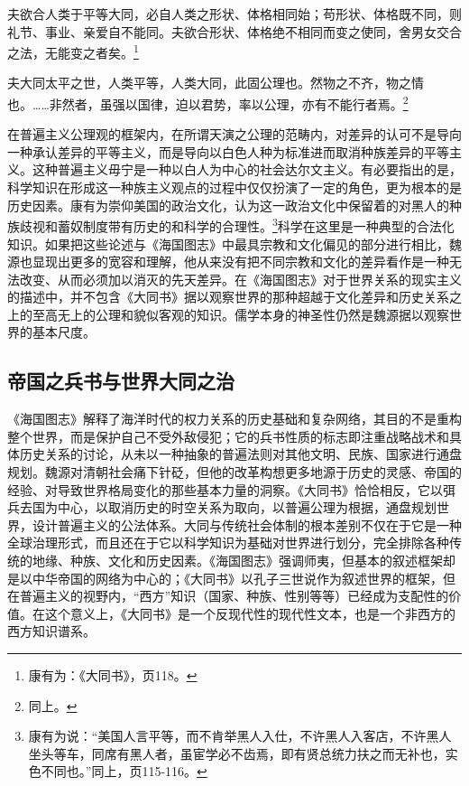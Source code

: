 \documentclass[a4paper, 12pt, openright]{ctexbook}
\renewenvironment{quote}
  {\list{}{\rightmargin2\ccwd \leftmargin2\ccwd \itemindent=2\ccwd \listparindent=2\ccwd}%
   \item\relax\small\kaishu\color{black}}
  {\endlist}
\begin{document}
\begin{quote}
夫欲合人类于平等大同，必自人类之形状、体格相同始；苟形状、体格既不同，则礼节、事业、亲爱自不能同。夫欲合形状、体格绝不相同而变之使同，舍男女交合之法，无能变之者矣。\footnote{康有为：《大同书》，页118。}

夫大同太平之世，人类平等，人类大同，此固公理也。然物之不齐，物之情也。……非然者，虽强以国律，迫以君势，率以公理，亦有不能行者焉。\footnote{同上。}
\end{quote}

在普遍主义公理观的框架内，在所谓天演之公理的范畴内，对差异的认可不是导向一种承认差异的平等主义，而是导向以白色人种为标准进而取消种族差异的平等主义。这种普遍主义毋宁是一种以白人为中心的社会达尔文主义。有必要指出的是，科学知识在形成这一种族主义观点的过程中仅仅扮演了一定的角色，更为根本的是历史因素。康有为崇仰美国的政治文化，认为这一政治文化中保留着的对黑人的种族歧视和蓄奴制度带有历史的和科学的合理性。\footnote{康有为说：“美国人言平等，而不肯举黑人入仕，不许黑人入客店，不许黑人坐头等车，同席有黑人者，虽宦学必不齿焉，即有贤总统力扶之而无补也，实色不同也。”同上，页115-116。}科学在这里是一种典型的合法化知识。如果把这些论述与《海国图志》中最具宗教和文化偏见的部分进行相比，魏源也显现出更多的宽容和理解，他从来没有把不同宗教和文化的差异看作是一种无法改变、从而必须加以消灭的先天差异。在《海国图志》对于世界关系的现实主义的描述中，并不包含《大同书》据以观察世界的那种超越于文化差异和历史关系之上的至高无上的公理和貌似客观的知识。儒学本身的神圣性仍然是魏源据以观察世界的基本尺度。

\subsection{帝国之兵书与世界大同之治}

《海国图志》解释了海洋时代的权力关系的历史基础和复杂网络，其目的不是重构整个世界，而是保护自己不受外敌侵犯；它的兵书性质的标志即注重战略战术和具体历史关系的讨论，从未以一种抽象的普遍法则对其他文明、民族、国家进行通盘规划。魏源对清朝社会痛下针砭，但他的改革构想更多地源于历史的灵感、帝国的经验、对导致世界格局变化的那些基本力量的洞察。《大同书》恰恰相反，它以弭兵去国为中心，以取消历史的时空关系为取向，以普遍公理为根据，通盘规划世界，设计普遍主义的公法体系。大同与传统社会体制的根本差别不仅在于它是一种全球治理形式，而且还在于它以科学知识为基础对世界进行划分，完全排除各种传统的地缘、种族、文化和历史因素。《海国图志》强调师夷，但基本的叙述框架却是以中华帝国的网络为中心的；《大同书》以孔子三世说作为叙述世界的框架，但在普遍主义的视野内，“西方”知识（国家、种族、性别等等）已经成为支配性的价值。在这个意义上，《大同书》是一个反现代性的现代性文本，也是一个非西方的西方知识谱系。
\end{document}
